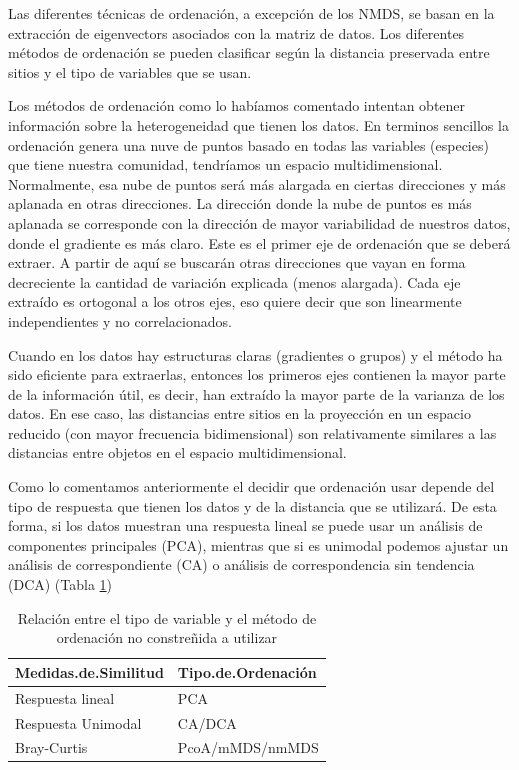 \documentclass[]{book}
\begin{document}
Las diferentes técnicas de ordenación, a excepción de los NMDS, se basan
en la extracción de eigenvectors asociados con la matriz de datos. Los
diferentes métodos de ordenación se pueden clasificar según la distancia
preservada entre sitios y el tipo de variables que se usan.

Los métodos de ordenación como lo habíamos comentado intentan obtener
información sobre la heterogeneidad que tienen los datos. En terminos
sencillos la ordenación genera una nuve de puntos basado en todas las
variables (especies) que tiene nuestra comunidad, tendríamos un espacio
multidimensional. Normalmente, esa nube de puntos será más alargada en
ciertas direcciones y más aplanada en otras direcciones. La dirección
donde la nube de puntos es más aplanada se corresponde con la dirección
de mayor variabilidad de nuestros datos, donde el gradiente es más
claro. Este es el primer eje de ordenación que se deberá extraer. A
partir de aquí se buscarán otras direcciones que vayan en forma
decreciente la cantidad de variación explicada (menos alargada). Cada
eje extraído es ortogonal a los otros ejes, eso quiere decir que son
linearmente independientes y no correlacionados.

Cuando en los datos hay estructuras claras (gradientes o grupos) y el
método ha sido eficiente para extraerlas, entonces los primeros ejes
contienen la mayor parte de la información útil, es decir, han extraído
la mayor parte de la varianza de los datos. En ese caso, las distancias
entre sitios en la proyección en un espacio reducido (con mayor
frecuencia bidimensional) son relativamente similares a las distancias
entre objetos en el espacio multidimensional.

Como lo comentamos anteriormente el decidir que ordenación usar depende
del tipo de respuesta que tienen los datos y de la distancia que se
utilizará. De esta forma, si los datos muestran una respuesta lineal se
puede usar un análisis de componentes principales (PCA), mientras que si
es unimodal podemos ajustar un análisis de correspondiente (CA) o
análisis de correspondencia sin tendencia (DCA) (Tabla
\ref{tab:ordenacion})

\begin{table}[t]

\caption{\label{tab:ordenacion}Relación entre el tipo de variable y el método de ordenación no constreñida a utilizar}
\centering
\begin{tabular}{ll}
\toprule
Medidas.de.Similitud & Tipo.de.Ordenación\\
\midrule
Respuesta lineal & PCA\\
Respuesta Unimodal & CA/DCA\\
Bray-Curtis & PcoA/mMDS/nmMDS\\
\bottomrule
\end{tabular}
\end{table}
\end{document}
